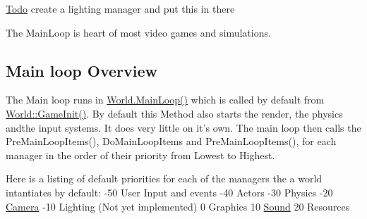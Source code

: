 \begin{Desc}
\item[\hyperlink{todo__todo000031}{Todo}]create a lighting manager and put this in there \end{Desc}


The MainLoop is heart of most video games and simulations.\hypertarget{dd/d99/mainloop1_mainloopoverview1}{}\subsection{Main loop Overview}\label{dd/d99/mainloop1_mainloopoverview1}
The Main loop runs in \hyperlink{classphys_1_1World_af1d9e36d43f5e50543fa2351a32c8362}{World.MainLoop()} which is called by default from \hyperlink{classphys_1_1World_a21cc36be08a61f40619584d4c438936b}{World::GameInit()}. By default this Method also starts the render, the physics andthe input systems. It does very little on it's own. The main loop then calls the PreMainLoopItems(), DoMainLoopItems and PreMainLoopItems(), for each manager in the order of their priority from Lowest to Highest. \par
 Here is a listing of default priorities for each of the managers the a world intantiates by default: -\/50 User Input and events -\/40 Actors -\/30 Physics -\/20 \hyperlink{classphys_1_1Camera}{Camera} -\/10 Lighting (Not yet implemented) 0 Graphics 10 \hyperlink{classphys_1_1Sound}{Sound} 20 Resources 